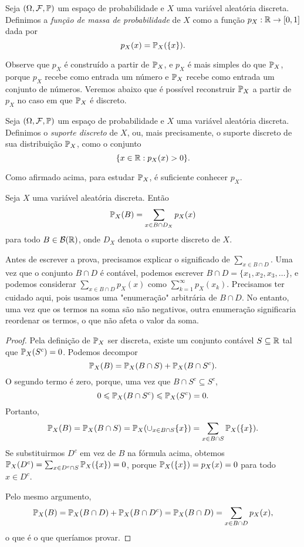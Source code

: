 \begin{definition}
Seja $ (\Omega, \mathcal F, \mathbb{P}) $ um espaço de probabilidade e $ X $ uma variável aleatória discreta.
Definimos a \emph{função de massa de probabilidade} de $ X $ como a função $ p_X : \mathbb{R} \to [0,1] $ dada por
\[
p_X(x) = \mathbb{P}_X(\{x\})
.
\]
\end{definition}

Observe que $ p_X $ é construído a partir de $ \mathbb{P}_X $, e $ p_X $ é mais simples do que $ \mathbb{P}_X $, porque $ p_X $ recebe como entrada um número e $ \mathbb{P}_X $ recebe como entrada um conjunto de números.
Veremos abaixo que é possível reconstruir $ \mathbb{P}_X $ a partir de $ p_X $ no caso em que $ \mathbb{P}_X $ é discreto.

\begin{definition}
Seja $ (\Omega,\mathcal F,\mathbb{P}) $ um espaço de probabilidade e $ X $ uma variável aleatória discreta.
Definimos o \emph{suporte discreto} de $ X $, ou, mais precisamente, o suporte discreto de sua distribuição $ \mathbb{P}_X $, como o conjunto
\[
\{x \in \mathbb{R} : p_X(x) > 0\}.
\]
\end{definition}

Como afirmado acima, para estudar $ \mathbb{P}_X $, é suficiente conhecer $ p_X $.

\begin{proposition}
\label{prop:distpmf}
Seja $ X $ uma variável aleatória discreta.
Então
\[
\mathbb{P}_X(B) = \sum_{x \in B \cap D_X} p_X(x)
\]
para todo $ B \in \mathcal B(\mathbb{R}) $, onde $ D_X $ denota o suporte discreto de $ X $.
\end{proposition}

\begin{notation*}
Antes de escrever a prova, precisamos explicar o significado de $ \sum_{x \in B \cap D} $.
Uma vez que o conjunto $ B \cap D $ é contável, podemos escrever $ B \cap D = \{x_1,x_2,x_3,\dots\} $, e podemos considerar
$ \sum_{x \in B \cap D} p_X(x) $
como
$ \sum_{k=1}^\infty p_X(x_k) $.
Precisamos ter cuidado aqui, pois usamos uma "enumeração" arbitrária de $ B \cap D $.
No entanto, uma vez que os termos na soma são não negativos, outra enumeração significaria reordenar os termos, o que não afeta o valor da soma.
\end{notation*}

\begin{proof}
Pela definição de $ \mathbb{P}_X $ ser discreta, existe um conjunto contável $ S\subseteq \mathbb{R} $ tal que $ \mathbb{P}_X(S^c)=0 $.
Podemos decompor
\[
\mathbb{P}_X(B) = \mathbb{P}_X(B \cap S) + \mathbb{P}_X(B \cap S^c)
.
\]
O segundo termo é zero, porque, uma vez que $ B \cap S^c \subseteq S^c $,
\[
0 \leqslant \mathbb{P}_X(B \cap S^c) \leqslant \mathbb{P}_X(S^c) = 0.
\]
Portanto,
\[
\mathbb{P}_X(B)
=
\mathbb{P}_X(B \cap S)
=
\mathbb{P}_X(\cup_{x\in B \cap S} \{x\})
=
\sum_{x \in B \cap S} \mathbb{P}_X(\{x\})
.
\]
Se substituirmos $ D^c $ em vez de $ B $ na fórmula acima, obtemos
$ \mathbb{P}_X(D^c) = \sum_{x \in D^c \cap S} \mathbb{P}_X(\{x\}) = 0 $, porque $ \mathbb{P}_X(\{x\})=p_X(x)=0 $ para todo $ x \in D^c $.

Pelo mesmo argumento,
\[
\mathbb{P}_X(B)
=
\mathbb{P}_X(B \cap D)
+
\mathbb{P}_X(B \cap D^c)
=
\mathbb{P}_X(B \cap D)
=
\sum_{x \in B \cap D} p_X(x)
,
\]
o que é o que queríamos provar.
\end{proof}

